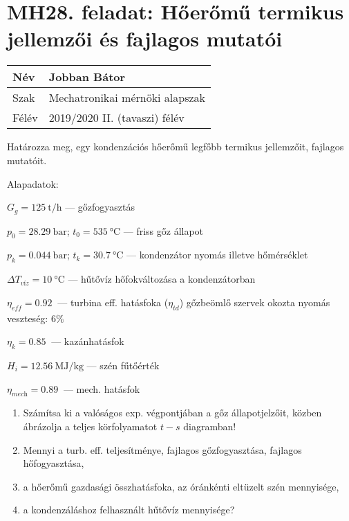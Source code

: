 \section*{MH28. feladat: Hőerőmű termikus jellemzői és fajlagos mutatói}

\begin{tabular}{ | p{2cm} | p{14cm} | } 
	\hline
	Név & Jobban Bátor \\ 
	\hline
	Szak & Mechatronikai mérnöki alapszak \\ 
	\hline
	Félév & 2019/2020 II. (tavaszi) félév \\ 
	\hline
\end{tabular}
\vspace{0.5cm}

\noindent Határozza meg, egy kondenzációs hőerőmű legfőbb termikus jellemzőit, fajlagos mutatóit.

\noindent Alapadatok:

	 $G_{g} = \SI{125}{\tonne\per\hour}$ --- gőzfogyasztás 
	
	 $p_{0} = \SI{28.29}{\bar}$; $t_{0} = \SI{535}{\celsius}$ --- friss gőz állapot
			
	 $p_{k} = \SI{0.044}{\bar}$; $t_{k} = \SI{30.7}{\celsius}$ --- kondenzátor nyomás illetve hőmérséklet	
	 
	 $\Delta T_{\textit{víz}} = \SI{10}{\celsius}$ --- hűtővíz hőfokváltozása a kondenzátorban
	 
	 $\eta_{\textit{eff}} = \SI{0.92}{}$ --- turbina eff. hatásfoka ($\eta_{td}$) gőzbeömlő szervek okozta nyomás veszteség: ${6}{\%}$
	 
	 $\eta_{k} = \SI{0.85}{}$ --- kazánhatásfok	
	 
	 $H_{i} = \SI{12.56}{\mega\J\per\kilogram}$ --- szén fűtőérték
	 
	 $\eta_{\textit{mech}} = \SI{0.89}{}$ --- mech. hatásfok

\begin{enumerate}
	\setlength\itemsep{0em}
	\item Számítsa ki a valóságos exp. végpontjában a gőz állapotjelzőit, közben ábrázolja a teljes körfolyamatot $t-s$ diagramban!
	\item Mennyi a turb. eff. teljesítménye, fajlagos gőzfogyasztása, fajlagos hőfogyasztása,
	\item a hőerőmű gazdasági összhatásfoka, az óránkénti eltüzelt szén mennyisége,
	\item a kondenzáláshoz felhasznált hűtővíz mennyisége?
\end{enumerate}

